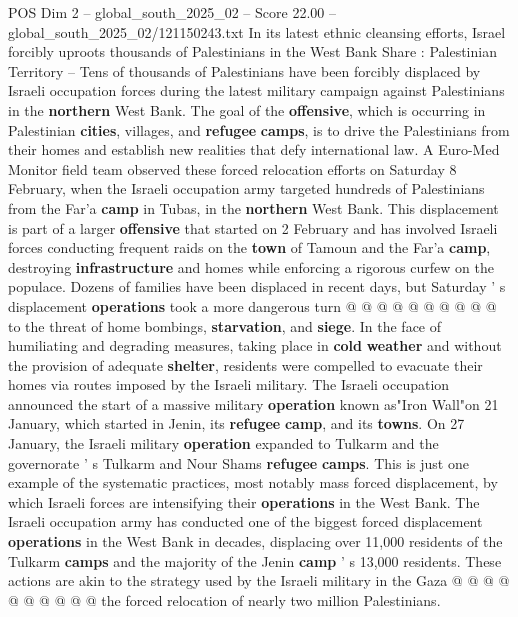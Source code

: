 \begin{textsample}{POS Dim 2 – global\_south\_2025\_02 – Score 22.00 – global\_south\_2025\_02/121150243.txt}  \label{ex:f2_pos_422}
In its latest ethnic cleansing efforts, Israel forcibly uproots thousands of Palestinians in the West Bank Share : Palestinian Territory -- Tens of thousands of Palestinians have been forcibly displaced by Israeli occupation forces during the latest military campaign against Palestinians in the \textbf{northern} West Bank.
The goal of the \textbf{offensive}, which is occurring in Palestinian \textbf{cities}, villages, and \textbf{refugee} \textbf{camps}, is to drive the Palestinians from their homes and establish new realities that defy international law.
A Euro-Med Monitor field team observed these forced relocation efforts on Saturday 8 February, when the Israeli occupation army targeted hundreds of Palestinians from the Far'a \textbf{camp} in Tubas, in the \textbf{northern} West Bank.
This displacement is part of a larger \textbf{offensive} that started on 2 February and has involved Israeli forces conducting frequent raids on the \textbf{town} of Tamoun and the Far'a \textbf{camp}, destroying \textbf{infrastructure} and homes while enforcing a rigorous curfew on the populace.
Dozens of families have been displaced in recent days, but Saturday ' s displacement \textbf{operations} took a more dangerous turn @ @ @ @ @ @ @ @ @ @ to the threat of home bombings, \textbf{starvation}, and \textbf{siege}.
In the face of humiliating and degrading measures, taking place in \textbf{cold} \textbf{weather} and without the provision of adequate \textbf{shelter}, residents were compelled to evacuate their homes via routes imposed by the Israeli military.
The Israeli occupation announced the start of a massive military \textbf{operation} known as"Iron Wall"on 21 January, which started in Jenin, its \textbf{refugee} \textbf{camp}, and its \textbf{towns}.
On 27 January, the Israeli military \textbf{operation} expanded to Tulkarm and the governorate ' s Tulkarm and Nour Shams \textbf{refugee} \textbf{camps}.
This is just one example of the systematic practices, most notably mass forced displacement, by which Israeli forces are intensifying their \textbf{operations} in the West Bank.
The Israeli occupation army has conducted one of the biggest forced displacement \textbf{operations} in the West Bank in decades, displacing over 11,000 residents of the Tulkarm \textbf{camps} and the majority of the Jenin \textbf{camp} ' s 13,000 residents.
These actions are akin to the strategy used by the Israeli military in the Gaza @ @ @ @ @ @ @ @ @ @ the forced relocation of nearly two million Palestinians.

\end{textsample}
